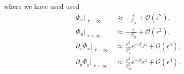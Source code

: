 \documentclass[11pt]{article}
\begin{document}
where we have used used
\begin{subequations}\begin{align}
    \Phi_x \Big\vert_{\substack{\tau=\infty}} &\approx - \frac{\epsilon}{\beta_A} + \mathcal{O}(\epsilon^2)
    , \\
    \Phi_y \Big\vert_{\substack{\tau=\infty}} &\approx - \frac{\epsilon}{\beta_B} + \mathcal{O}(\epsilon^2)
    , \\
    \partial_x \Phi_x \Big\vert_{\substack{\tau=\infty}} &\approx \frac{\epsilon^2}{\beta_A^2}e^{-\beta_Au} +\mathcal{O}(\epsilon^3), \\
    \partial_y \Phi_y \Big\vert_{\substack{\tau=\infty}} &\approx \frac{\epsilon^2}{\beta_B^2}e^{-\beta_Bu} +\mathcal{O}(\epsilon^3).
\end{align}\end{subequations}
\end{document}
